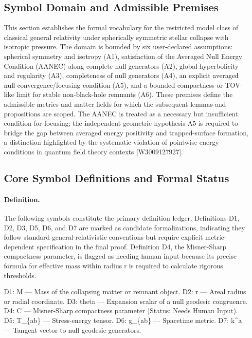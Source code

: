 \documentclass[conference]{IEEEtran}
\begin{document}
\subsection{Symbol Domain and Admissible Premises}
This section establishes the formal vocabulary for the restricted model class of classical general relativity under spherically symmetric stellar collapse with isotropic pressure. The domain is bounded by six user-declared assumptions: spherical symmetry and isotropy (A1), satisfaction of the Averaged Null Energy Condition (AANEC) along complete null generators (A2), global hyperbolicity and regularity (A3), completeness of null generators (A4), an explicit averaged null-convergence/focusing condition (A5), and a bounded compactness or TOV-like limit for stable non-black-hole remnants (A6). These premises define the admissible metrics and matter fields for which the subsequent lemmas and propositions are scoped. The AANEC is treated as a necessary but insufficient condition for focusing; the independent geometric hypothesis A5 is required to bridge the gap between averaged energy positivity and trapped-surface formation, a distinction highlighted by the systematic violation of pointwise energy conditions in quantum field theory contexts [W3009127927].~\cite{cite_0ed84243cf171bc4}

\subsection{Core Symbol Definitions and Formal Status}
\paragraph{Definition.} The following symbols constitute the primary definition ledger. Definitions D1, D2, D3, D5, D6, and D7 are marked as candidate formalizations, indicating they follow standard general-relativistic conventions but require explicit metric-dependent specification in the final proof. Definition D4, the Misner-Sharp compactness parameter, is flagged as needing human input because its precise formula for effective mass within radius r is required to calculate rigorous thresholds.

D1: M — Mass of the collapsing matter or remnant object. D2: r — Areal radius or radial coordinate. D3: theta — Expansion scalar of a null geodesic congruence. D4: C — Misner-Sharp compactness parameter (Status: Needs Human Input). D5: T\_\{ab\} — Stress-energy tensor. D6: g\_\{ab\} — Spacetime metric. D7: k\textasciicircum{}a — Tangent vector to null geodesic generators.
\end{document}
